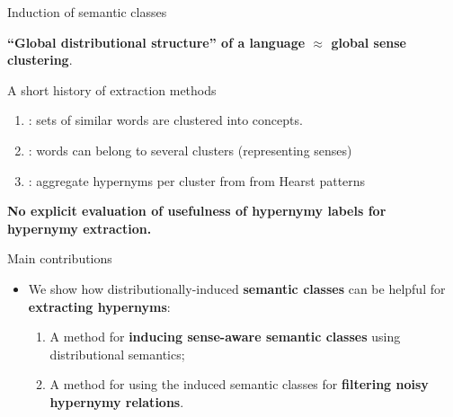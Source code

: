 \documentclass[usenames,dvipsnames]{beamer}
\begin{document}
\begin{frame}{Induction of semantic classes}

\vspace{-10pt}
\textbf{``\alert{Global distributional structure}'' of a language $\approx$ global sense clustering}.
\pause 
\begin{block}{A short history of extraction methods}

\begin{enumerate}
	\item  \cite{Lin2001}: sets of similar words are clustered into concepts.
	\item \cite{Pantel2002}: words can belong to several clusters (representing senses)
	\item \cite{Pantel2004}: aggregate hypernyms per cluster from from Hearst patterns
 

\end{enumerate}
\end{block}

\textbf{No explicit evaluation of \alert{usefulness} of hypernymy labels for \alert{hypernymy extraction}.}

\end{frame}

\begin{frame}{Main contributions}


\begin{itemize}
	\item We show how distributionally-induced \alert{\textbf{semantic classes}} can be helpful  for \alert{\textbf{extracting hypernyms}}:
	\pause
	\vspace{10pt}
	\begin{enumerate}
		\item A method for \textbf{\alert{inducing sense-aware semantic classes}} using distributional semantics; 
		\vspace{10pt}
		\item A method for using the induced semantic classes for \textbf{\alert{filtering noisy hypernymy relations}}.
	 \end{enumerate}
\end{itemize}
\end{frame}
\end{document}
